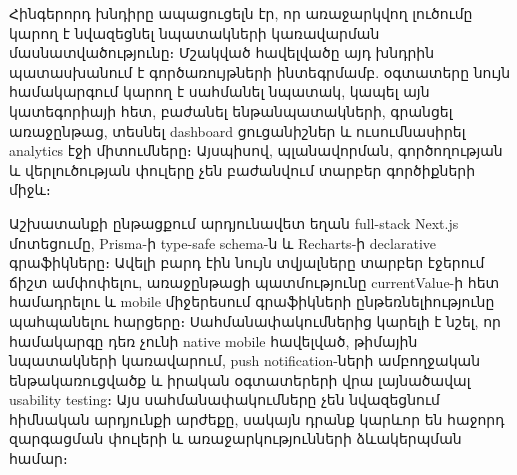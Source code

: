 Հինգերորդ խնդիրը ապացուցելն էր, որ առաջարկվող լուծումը կարող է նվազեցնել նպատակների կառավարման մասնատվածությունը։ Մշակված հավելվածը այդ խնդրին պատասխանում է գործառույթների ինտեգրմամբ. օգտատերը նույն համակարգում կարող է սահմանել նպատակ, կապել այն կատեգորիայի հետ, բաժանել ենթանպատակների, գրանցել առաջընթաց, տեսնել dashboard ցուցանիշներ և ուսումնասիրել analytics էջի միտումները։ Այսպիսով, պլանավորման, գործողության և վերլուծության փուլերը չեն բաժանվում տարբեր գործիքների միջև։

Աշխատանքի ընթացքում արդյունավետ եղան full-stack Next.js մոտեցումը, Prisma-ի type-safe schema-ն և Recharts-ի declarative գրաֆիկները։ Ավելի բարդ էին նույն տվյալները տարբեր էջերում ճիշտ ամփոփելու, առաջընթացի պատմությունը currentValue-ի հետ համադրելու և mobile միջերեսում գրաֆիկների ընթեռնելիությունը պահպանելու հարցերը։ Սահմանափակումներից կարելի է նշել, որ համակարգը դեռ չունի native mobile հավելված, թիմային նպատակների կառավարում, push notification-ների ամբողջական ենթակառուցվածք և իրական օգտատերերի վրա լայնածավալ usability testing։ Այս սահմանափակումները չեն նվազեցնում հիմնական արդյունքի արժեքը, սակայն դրանք կարևոր են հաջորդ զարգացման փուլերի և առաջարկությունների ձևակերպման համար։

\fussy

